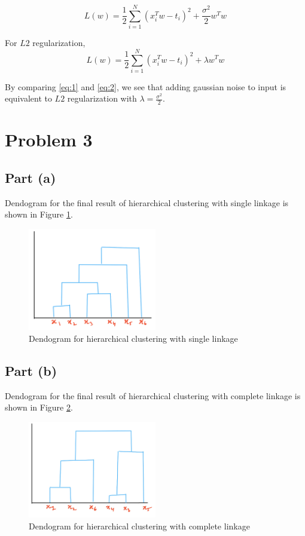 \documentclass[12pt]{article}
\begin{document}
\begin{equation}
    L(w) = \frac{1}{2} \sum_{i=1}^{N} (x_i^T w - t_i)^2 + \frac{\sigma^2}{2} w^T w
    \tag{1}\label{eq:1}
\end{equation}

For $L2$ regularization, 
\begin{equation}
    L(w) = \frac{1}{2} \sum_{i=1}^{N} (x_i^T w - t_i)^2 + \lambda w^T w
    \tag{2}\label{eq:2}
\end{equation}

By comparing \eqref{eq:1} and \eqref{eq:2}, we see that adding gaussian noise to input is equivalent to $L2$ regularization with $\lambda = \frac{\sigma^2}{2}$.

\section*{Problem 3}
\subsection*{Part (a)}
Dendogram for the final result of hierarchical clustering with single linkage is shown in Figure \ref{fig:3a}.
\begin{figure}[h]
    \centering
    \includegraphics[width=0.5\textwidth]{./images/3a.jpg}
    \caption{Dendogram for hierarchical clustering with single linkage}
    \label{fig:3a}
\end{figure}

\subsection*{Part (b)}
Dendogram for the final result of hierarchical clustering with complete linkage is shown in Figure \ref{fig:3b}.
\begin{figure}[h]
    \centering
    \includegraphics[width=0.5\textwidth]{./images/3b.jpeg}
    \caption{Dendogram for hierarchical clustering with complete linkage}
    \label{fig:3b}
\end{figure}
\end{document}
